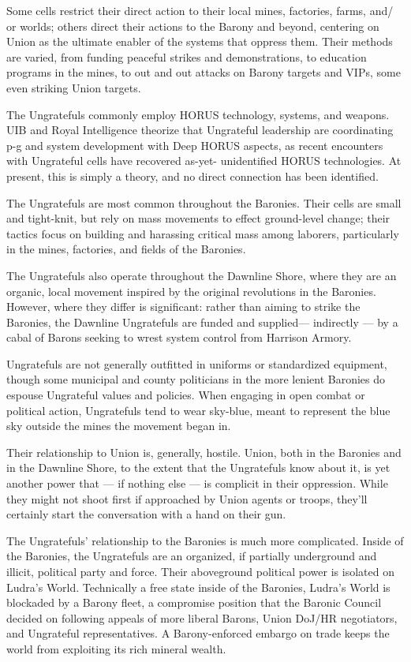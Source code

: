 Some cells restrict their direct action to their local mines, factories, farms, and/ or worlds; others
direct their actions to the Barony and beyond, centering on Union as the ultimate enabler of the
systems that oppress them. Their methods are varied, from funding peaceful strikes and
demonstrations, to education programs in the mines, to out and out attacks on Barony targets
and VIPs, some even striking Union targets.

The Ungratefuls commonly employ HORUS technology, systems, and weapons. UIB and Royal
Intelligence theorize that Ungrateful leadership are coordinating p-g and system development
with Deep HORUS aspects, as recent encounters with Ungrateful cells have recovered as-yet-
unidentified HORUS technologies. At present, this is simply a theory, and no direct connection
has been identified.

The Ungratefuls are most common throughout the Baronies. Their cells are small and tight-knit,
but rely on mass movements to effect ground-level change; their tactics focus on building and
harassing critical mass among laborers, particularly in the mines, factories, and fields of the
Baronies.

The Ungratefuls also operate throughout the Dawnline Shore, where they are an organic, local
movement inspired by the original revolutions in the Baronies. However, where they differ is
significant: rather than aiming to strike the Baronies, the Dawnline Ungratefuls are funded and
supplied— indirectly — by a cabal of Barons seeking to wrest system control from Harrison
Armory.

Ungratefuls are not generally outfitted in uniforms or standardized equipment, though some
municipal and county politicians in the more lenient Baronies do espouse Ungrateful values and
policies. When engaging in open combat or political action, Ungratefuls tend to wear sky-blue,
meant to represent the blue sky outside the mines the movement began in.

Their relationship to Union is, generally, hostile. Union, both in the Baronies and in the Dawnline
Shore, to the extent that the Ungratefuls know about it, is yet another power that — if nothing
else — is complicit in their oppression. While they might not shoot first if approached by Union
agents or troops, they'll certainly start the conversation with a hand on their gun.

The Ungratefuls' relationship to the Baronies is much more complicated. Inside of the Baronies,
the Ungratefuls are an organized, if partially underground and illicit, political party and force.
Their aboveground political power is isolated on Ludra's World. Technically a free state inside of
the Baronies, Ludra's World is blockaded by a Barony fleet, a compromise position that the
Baronic Council decided on following appeals of more liberal Barons, Union DoJ/HR negotiators,
and Ungrateful representatives. A Barony-enforced embargo on trade keeps the world from
exploiting its rich mineral wealth.

